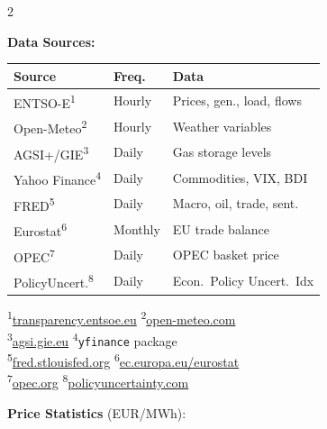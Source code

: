 \documentclass[11pt,a4paper]{article}
\begin{document}
\begin{multicols}{2}
\columnbreak

\textbf{Data Sources:}
\vspace{0.1cm}

\small
\begin{tabular}{l l l}
\toprule
\textbf{Source} & \textbf{Freq.} & \textbf{Data} \\
\midrule
ENTSO-E\textsuperscript{1}       & Hourly   & Prices, gen., load, flows \\
Open-Meteo\textsuperscript{2}    & Hourly   & Weather variables \\
AGSI+/GIE\textsuperscript{3}     & Daily    & Gas storage levels \\
Yahoo Finance\textsuperscript{4}  & Daily    & Commodities, VIX, BDI \\
FRED\textsuperscript{5}          & Daily    & Macro, oil, trade, sent. \\
Eurostat\textsuperscript{6}      & Monthly  & EU trade balance \\
OPEC\textsuperscript{7}          & Daily    & OPEC basket price \\
PolicyUncert.\textsuperscript{8} & Daily    & Econ.\ Policy Uncert.\ Idx \\
\bottomrule
\end{tabular}

{\tiny
\textsuperscript{1}\url{transparency.entsoe.eu} \quad
\textsuperscript{2}\url{open-meteo.com} \\
\textsuperscript{3}\url{agsi.gie.eu} \quad
\textsuperscript{4}\texttt{yfinance} package \\
\textsuperscript{5}\url{fred.stlouisfed.org} \quad
\textsuperscript{6}\url{ec.europa.eu/eurostat} \\
\textsuperscript{7}\url{opec.org} \quad
\textsuperscript{8}\url{policyuncertainty.com}
}

\vspace{0.3cm}

\textbf{Price Statistics} (EUR/MWh):
\vspace{0.1cm}


\end{multicols}
\end{document}

